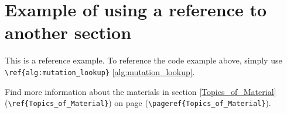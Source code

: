 \section{Example of using a reference to another section}

This is a reference example. To reference the code example above, simply use \\
\verb|\ref{alg:mutation_lookup}| \ref{alg:mutation_lookup}.

Find more information about the materials in section \ref{Topics_of_Material} \\
(\verb|\ref{Topics_of_Material}|) on page \pageref{Topics_of_Material}
(\verb|\pageref{Topics_of_Material}|).
